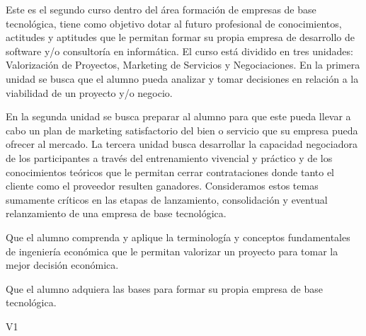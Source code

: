 \begin{syllabus}


\begin{justification}
   Este es el segundo curso dentro del área formación de empresas de base tecnológica, tiene como objetivo dotar al futuro profesional de conocimientos, actitudes y aptitudes que le permitan formar su propia empresa de desarrollo de software y/o consultoría en informática. El curso está dividido en tres unidades: Valorización de Proyectos, Marketing de Servicios y Negociaciones. En la primera unidad se busca que el alumno pueda analizar y tomar decisiones en relación a la viabilidad de un proyecto y/o negocio.
   
   En la segunda unidad se busca preparar al alumno para que este pueda llevar a cabo un plan de marketing satisfactorio del bien o servicio que su empresa pueda ofrecer al mercado. La tercera unidad busca desarrollar la capacidad negociadora de los participantes a través del entrenamiento vivencial y práctico y de los conocimientos teóricos que le permitan cerrar contrataciones donde tanto el cliente como el proveedor resulten ganadores. Consideramos estos temas sumamente críticos en las etapas de lanzamiento, consolidación y eventual relanzamiento de una empresa de base tecnológica.
   \end{justification}
   
   \begin{goals}
   \item Que el alumno comprenda y aplique la terminología y conceptos fundamentales de ingeniería económica que le permitan valorizar un proyecto para tomar la mejor decisión económica.
   \item Que el alumno adquiera las bases para formar su propia empresa de base tecnológica.
   \end{goals}
   
   \begin{outcomes}{V1}
      \item {}
      \item {}
      \item {}
   \end{outcomes}
   

\end{syllabus}
